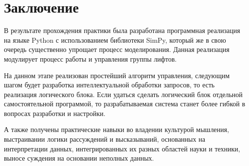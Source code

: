 \newpage
\section{Заключение}
	В результате прохождения практики была разработана программная реализация на языке Python
		с использованием библиотеки SimPy, который же в свою очередь существенно упрощает процесс моделирования.
		Данная реализация модулирует процесс работы и управления группы лифтов.

	На данном этапе реализован простейший алгоритм управления, следующим шагом будет
		разработка интеллектуальной обработки запросов, то есть реализация логического блока.
		Если удаться сделать логический блок отдельной самостоятельной программой, то разрабатываемая
		система станет более гибкой в вопросах разработки и настройки.

	А также получены практические навыки во владении культурой мышления, выстраивании логики рассуждений и высказываний, основанных на интерпретации данных, интегрированных их разных областей науки и техники, выносе суждения на основании неполных данных.
